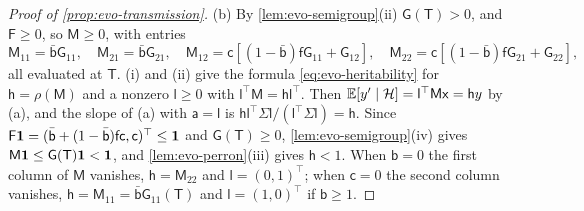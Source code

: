 \begin{proof}[Proof of \cref{prop:evo-transmission}]
(b) By \cref{lem:evo-semigroup}(ii) $\mathsf G(\mathsf T)>0$, and $\mathsf F\ge0$, so $\mathsf M\ge0$, with entries
\begin{equation}\label{eq:evo-M-entries}
\mathsf M_{11}=\bar{\mathsf b}\mathsf G_{11},\quad\mathsf M_{21}=\bar{\mathsf b}\mathsf G_{21},\quad\mathsf M_{12}=\mathsf c[(1-\bar{\mathsf b})\mathsf f\mathsf G_{11}+\mathsf G_{12}],\quad\mathsf M_{22}=\mathsf c[(1-\bar{\mathsf b})\mathsf f\mathsf G_{21}+\mathsf G_{22}],
\end{equation}
all evaluated at $\mathsf T$. (i) and (ii) give the formula \eqref{eq:evo-heritability} for $\mathsf h=\rho(\mathsf M)$ and a nonzero $\mathsf l\ge0$ with $\mathsf l^\top\mathsf M=\mathsf h\mathsf l^\top$. Then $\mathbb{E}[y'\mid\mathcal H]=\mathsf l^\top\mathsf M\mathsf x=\mathsf hy$ by (a), and the slope of (a) with $\mathsf a=\mathsf l$ is $\mathsf h\mathsf l^\top\Sigma\mathsf l/(\mathsf l^\top\Sigma\mathsf l)=\mathsf h$. Since $\mathsf F\mathbf{1}=(\bar{\mathsf b}+(1-\bar{\mathsf b})\mathsf f\mathsf c,\mathsf c)^\top\le\mathbf{1}$ and $\mathsf G(\mathsf T)\ge0$, \cref{lem:evo-semigroup}(iv) gives $\mathsf M\mathbf{1}\le\mathsf G(\mathsf T)\mathbf{1}<\mathbf{1}$, and \cref{lem:evo-perron}(iii) gives $\mathsf h<1$. When $\mathsf b=0$ the first column of $\mathsf M$ vanishes, $\mathsf h=\mathsf M_{22}$ and $\mathsf l=(0,1)^\top$; when $\mathsf c=0$ the second column vanishes, $\mathsf h=\mathsf M_{11}=\bar{\mathsf b}\mathsf G_{11}(\mathsf T)$ and $\mathsf l=(1,0)^\top$ if $\mathsf b\ge1$.


\end{proof}
